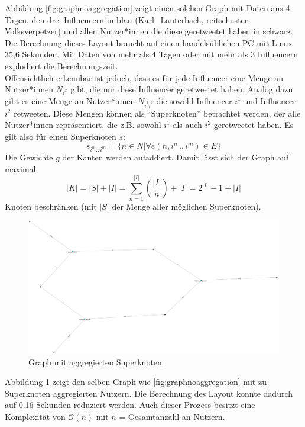 Abbildung \ref{fig:graphnoaggregation} zeigt einen solchen Graph mit Daten aus 4 Tagen, den drei Influencern in blau (Karl\_Lauterbach, reitschuster, Volksverpetzer) und allen Nutzer*innen die diese \gls{geretweetet} haben in schwarz. Die Berechnung dieses Layout braucht auf einen handelsüblichen PC mit Linux 35,6 Sekunden. 
Mit Daten von mehr als 4 Tagen oder mit mehr als 3 Influencern explodiert die Berechnungszeit. \\
Offensichtlich erkennbar ist jedoch, dass es  für jede Influencer eine Menge an Nutzer*innen $N_{i^x}$ gibt, die nur diese Influencer \gls{geretweetet} haben.
Analog dazu gibt es eine Menge an Nutzer*innen $N_{i^1i^2}$ die sowohl Influencer $i^1$ und Influencer $i^2$ retweeten. 
Diese Mengen können als "`Superknoten"' betrachtet werden, der alle Nutzer*innen repräsentiert, die z.B. sowohl $i^1$ als auch $i^2$ \gls{geretweetet} haben.
Es gilt also für einen Superknoten $s$:
 \begin{equation}
s_{i^n\,..\,i^m} = \{n\in N|\forall e(n,i^n\,..\,i^m)\in E\}
\end{equation}
Die Gewichte $g$ der Kanten werden aufaddiert. 
Damit lässt sich der Graph auf maximal
\begin{equation}
|K| = |S| + |I| = \sum_{n=1}^{|I|} \binom{|I|}{n} + |I| = 2^{|I|} - 1 + |I|
\end{equation}
Knoten beschränken (mit $|S|$ der Menge aller möglichen Superknoten).
\begin{figure}[h]
	\centering
	\includegraphics[width=0.7\linewidth]{images/GraphNoThreshold}
	\caption{Graph mit aggregierten Superknoten}
	\label{fig:graphnothreshold}
\end{figure}
Abbildung \ref{fig:graphnothreshold} zeigt den selben Graph wie \ref{fig:graphnoaggregation} mit zu Superknoten aggregierten Nutzern.
Die Berechnung des Layout konnte dadurch auf 0.16 Sekunden reduziert werden.
Auch dieser Prozess besitzt eine Komplexität von $\mathcal{O}(n)$ mit $n$ = Gesamtanzahl an Nutzern. \pagebreak

